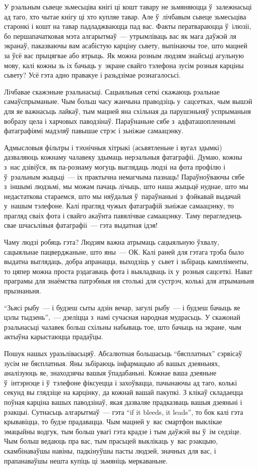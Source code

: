 У рэальным сьвеце зьмесьціва кнігі ці кошт тавару не зьмяняюцца ў~залежнасьці ад таго, хто чытае кнігу ці хто купляе тавар. Але ў~лічбавым сьвеце зьмесьціва старонкі і кошт на тавар падладжваюцца пад вас. Факты ператвараюцца ў~ілюзіі, бо першапачатковая мэта алгарытмаў~--- утрымліваць вас як мага даўжэй ля экранаў, паказваючы вам асабістую карціну сьвету, выпінаючы тое, што мацней за ўсё вас прыцягвае або ятрыць. Як можна розным людзям знайсьці агульную мову, калі кожны зь іх бачыць у~экране свайго тэлефона зусім розныя карціны сьвету? Усё гэта адно правакуе і разьдзімае рознагалосьсі.

Лічбавае скажэньне рэальнасьці. Сацыяльныя сеткі скажаюць рэальнае самаўспрыманьне. Чым больш часу жанчына праводзіць у~сацсетках, чым вышэй для яе важнасьць лайкаў, тым мацней яна схільная да парушэньняў успрыманьня вобразу цела і харчовых паводзінаў. Параўнаньне сябе з~адфаташопленнымі фатаграфіямі мадэляў павышае стрэс і зьніжае самаацэнку.

Адмысловыя фільтры і тэхнічныя хітрыкі (асьвятленьне і вугал здымкі) дазваляюць кожнаму чалавеку здымаць нерэальныя фатаграфіі. Думаю, кожны з~нас дзівіўся, як па-рознаму могуць выглядаць людзі на фота профілю і ў~рэальным жыцьці~--- іх практычна немагчыма пазнаць! Параўноўваючы сябе з~іншымі людзьмі, мы можам пачаць лічыць, што наша жыцьцё нуднае, што мы недастаткова стараемся, што мы няўдалыя ў~параўнаньні з~фэйкавай выдачай у~нашым тэлефоне. Калі прагляд чужых фатаграфій зьніжае самаацэнку, то прагляд сваіх фота і свайго акаўнта павялічвае самаацэнку. Таму перагледзець свае шчасьлівыя фатаграфіі~--- гэта выдатная ідэя!

Чаму людзі робяць гэта? Людзям важна атрымаць сацыяльную ўхвалу, сацыяльнае пацверджаньне, што яны~--- ОК. Калі раней для гэтага трэба было выдатна выглядаць, добра апранацца, выходзіць у~сьвет і зьбіраць кампліменты, то цяпер можна проста рэдагаваць фота і выкладваць іх у~розныя сацсеткі. Нават праграмы для знаёмства патрэбныя ня столькі для сустрэч, колькі для атрыманьня прызнаньня.

``Зьясі рыбу~--- і будзеш сыты адзін вечар, загулі рыбу~--- і будзеш бачыць яе цэлы тыдзень'',~--- дзеліцца з~намі сучасная народная мудрасьць. У скажонай рэальнасьці чалавек больш схільны набываць тое, што бачыць на экране, чым актыўна карыстаюцца прадаўцы.

Пошук нашых уразьлівасьцяў. Абсалютная большасьць ``бясплатных'' сэрвісаў зусім не бясплатныя. Яны зьбіраюць інфармацыю аб вашых дзеяньнях, аналізуюць яе, знаходзячы вашыя ўпадабаньні. Кожнае ваша дзеяньне ў~інтэрнэце і ў~тэлефоне фіксуецца і захоўвацца, пачынаючы ад таго, колькі секунд вы глядзіце на карцінку, да кожнай вашай пакупкі. З клікаў складаецца поўная карціна вашых паводзінаў, якая дазваляе прадказваць вашыя дзеяньні і рэакцыі. Сутнасьць алгарытмаў~--- гэта ``if it bleeds, it leads'', то бок калі гэта крывавіцца, то будзе прадавацца. Чым мацней у~вас смартфон выклікае эмацыйны водгук, тым больш увагі гэта крадзе і тым даўжэй вы ў~ім седзіце. Чым больш ведаюць пра вас, тым прасьцей выклікаць у~вас рэакцыю, скамбінаваўшы навіны, падкінуўшы пасты людзей, значных для вас, і прапанаваўшы нешта купіць ці зьмяніць меркаваньне.

